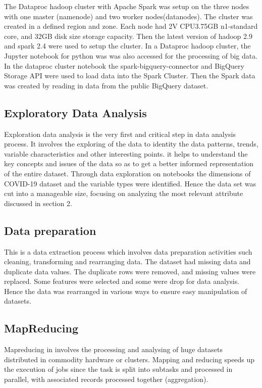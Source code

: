 \documentclass[12pt]{article}
\begin{document}
The Dataproc hadoop cluster with Apache Spark was setup on the three nodes with one master (namenode) and two worker nodes(datanodes). The cluster was created in a defined region and zone. Each node had 2V CPU3.75GB n1-standard core, and 32GB disk size storage capacity. Then the latest version of hadoop 2.9 and spark 2.4 were used to setup the cluster. In a Dataproc hadoop cluster, the Jupyter notebook for python was was also accessed for the processing of big data.  In the dataproc cluster notebook the spark-bigquery-connector and BigQuery Storage API were used to  load data into the Spark Cluster. Then the Spark data was created by reading in data from the public BigQuery dataset. 

\subsection{ Exploratory Data Analysis}
Exploration data analysis is the very first and critical step in data analysis process. It involves the exploring of the data to identity the data patterns, trends, variable characteristics and other interesting points. it helps to understand the key concepts and issues of the data so as to get a better informed representation of the entire dataset. Through data exploration on notebooks the dimensions of COVID-19 dataset and the variable types were identified. Hence the data set was cut into a manageable size, focusing on analyzing the most relevant attribute discussed in section 2. 

\subsection{Data preparation}
 This is a data extraction process which involves data preparation activities such cleaning, transforming and rearranging  data. The dataset had missing data and duplicate data values. The duplicate rows were removed, and missing values were replaced. Some features were selected and some were drop for data analysis. Hence the data was rearranged in various ways to ensure easy manipulation of datasets. 


\subsection{MapReducing}
Mapreducing  in involves the processing and analysing of  huge datasets distributed in commodity hardware  or clusters.  Mapping and reducing speeds up the execution of jobs since the task is split into subtasks and processed in parallel, with associated records processed together (aggregation).
\end{document}
